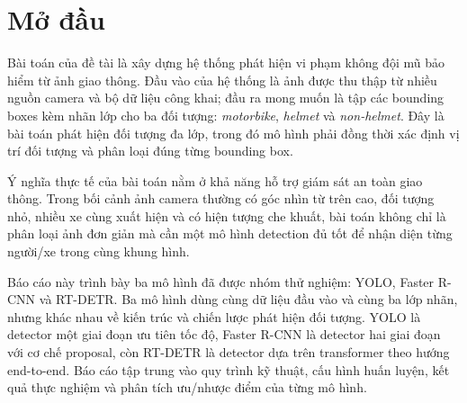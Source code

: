\section{Mở đầu}

Bài toán của đề tài là xây dựng hệ thống phát hiện vi phạm không đội mũ bảo hiểm từ ảnh giao thông. Đầu vào của hệ thống là ảnh được thu thập từ nhiều nguồn camera và bộ dữ liệu công khai; đầu ra mong muốn là tập các bounding boxes kèm nhãn lớp cho ba đối tượng: \textit{motorbike}, \textit{helmet} và \textit{non-helmet}. Đây là bài toán phát hiện đối tượng đa lớp, trong đó mô hình phải đồng thời xác định vị trí đối tượng và phân loại đúng từng bounding box.

Ý nghĩa thực tế của bài toán nằm ở khả năng hỗ trợ giám sát an toàn giao thông. Trong bối cảnh ảnh camera thường có góc nhìn từ trên cao, đối tượng nhỏ, nhiều xe cùng xuất hiện và có hiện tượng che khuất, bài toán không chỉ là phân loại ảnh đơn giản mà cần một mô hình detection đủ tốt để nhận diện từng người/xe trong cùng khung hình.

Báo cáo này trình bày ba mô hình đã được nhóm thử nghiệm: YOLO, Faster R-CNN và RT-DETR. Ba mô hình dùng cùng dữ liệu đầu vào và cùng ba lớp nhãn, nhưng khác nhau về kiến trúc và chiến lược phát hiện đối tượng. YOLO là detector một giai đoạn ưu tiên tốc độ, Faster R-CNN là detector hai giai đoạn với cơ chế proposal, còn RT-DETR là detector dựa trên transformer theo hướng end-to-end. Báo cáo tập trung vào quy trình kỹ thuật, cấu hình huấn luyện, kết quả thực nghiệm và phân tích ưu/nhược điểm của từng mô hình.
